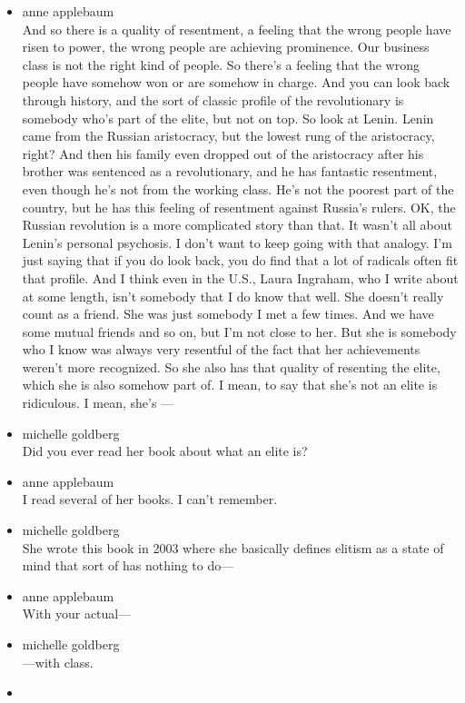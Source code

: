 \begin{itemize}
\item
  anne applebaum\\
  And so there is a quality of resentment, a feeling that the wrong
  people have risen to power, the wrong people are achieving prominence.
  Our business class is not the right kind of people. So there's a
  feeling that the wrong people have somehow won or are somehow in
  charge. And you can look back through history, and the sort of classic
  profile of the revolutionary is somebody who's part of the elite, but
  not on top. So look at Lenin. Lenin came from the Russian aristocracy,
  but the lowest rung of the aristocracy, right? And then his family
  even dropped out of the aristocracy after his brother was sentenced as
  a revolutionary, and he has fantastic resentment, even though he's not
  from the working class. He's not the poorest part of the country, but
  he has this feeling of resentment against Russia's rulers. OK, the
  Russian revolution is a more complicated story than that. It wasn't
  all about Lenin's personal psychosis. I don't want to keep going with
  that analogy. I'm just saying that if you do look back, you do find
  that a lot of radicals often fit that profile. And I think even in the
  U.S., Laura Ingraham, who I write about at some length, isn't somebody
  that I do know that well. She doesn't really count as a friend. She
  was just somebody I met a few times. And we have some mutual friends
  and so on, but I'm not close to her. But she is somebody who I know
  was always very resentful of the fact that her achievements weren't
  more recognized. So she also has that quality of resenting the elite,
  which she is also somehow part of. I mean, to say that she's not an
  elite is ridiculous. I mean, she's ---
\item
  michelle goldberg\\
  Did you ever read her book about what an elite is?
\item
  anne applebaum\\
  I read several of her books. I can't remember.
\item
  michelle goldberg\\
  She wrote this book in 2003 where she basically defines elitism as a
  state of mind that sort of has nothing to do---
\item
  anne applebaum\\
  With your actual---
\item
  michelle goldberg\\
  ---with class.
\item

\end{itemize}

